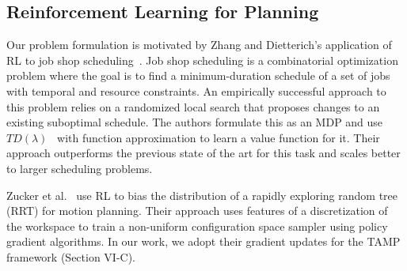 \subsection{Reinforcement Learning for Planning}
Our problem formulation is motivated by Zhang and Dietterich's application of RL to job
shop scheduling~\cite{JobShopSched}. Job shop scheduling is a combinatorial optimization problem where the goal is to find
a minimum-duration schedule of a set of jobs with temporal and resource constraints. An empirically
successful approach to this problem relies on a randomized local search that proposes changes to an
existing suboptimal schedule. The authors formulate this as an MDP and use $TD(\lambda)$~\cite{suttonbarto} with function
approximation to learn a value function for it. Their approach outperforms the previous state of the art for this task and
scales better to larger scheduling problems.

Zucker et al.~\cite{workspacebias} use RL to bias the distribution of a rapidly exploring random tree (RRT)
for motion planning. Their approach uses features of a discretization of the workspace to train
a non-uniform configuration space sampler using policy gradient algorithms.
In our work, we adopt their gradient updates for the TAMP framework (Section VI-C).
